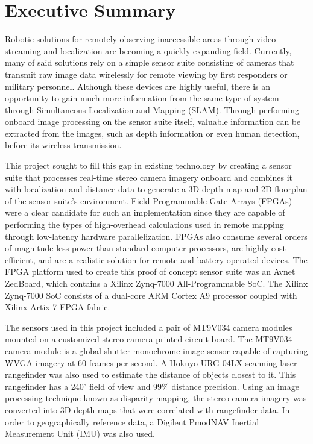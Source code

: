 {}
\section*{Executive Summary}

Robotic solutions for remotely observing inaccessible areas through video streaming and localization are becoming a quickly expanding field. Currently, many of said solutions rely on a simple sensor suite consisting of cameras that transmit raw image data wirelessly for remote viewing by first responders or military personnel. Although these devices are highly useful, there is an opportunity to gain much more information from the same type of system through Simultaneous Localization and Mapping (SLAM). Through performing onboard image processing on the sensor suite itself, valuable information can be extracted from the images, such as depth information or even human detection, before its wireless transmission.
\par
This project sought to fill this gap in existing technology by creating a sensor suite that processes real-time stereo camera imagery onboard and combines it with localization and distance data to generate a 3D depth map and 2D floorplan of the sensor suite's environment. Field Programmable Gate Arrays (FPGAs) were a clear candidate for such an implementation since they are capable of performing the types of high-overhead calculations used in remote mapping through low-latency hardware parallelization. FPGAs also consume several orders of magnitude less power than standard computer processors, are highly cost efficient, and are a realistic solution for remote and battery operated devices. The FPGA platform used to create this proof of concept sensor suite was an Avnet ZedBoard, which contains a Xilinx Zynq-7000 All-Programmable SoC. The Xilinx Zynq-7000 SoC consists of a dual-core ARM Cortex A9 processor coupled with Xilinx Artix-7 FPGA fabric.
\par
The sensors used in this project included a pair of MT9V034 camera modules mounted on a customized stereo camera printed circuit board. The MT9V034 camera module is a global-shutter monochrome image sensor capable of capturing WVGA imagery at 60 frames per second. A Hokuyo URG-04LX scanning laser rangefinder was also used to estimate the distance of objects closest to it. This rangefinder has a 240$^\circ$ field of view and 99\% distance precision. Using an image processing technique known as disparity mapping, the stereo camera imagery was converted into 3D depth maps that were correlated with rangefinder data. In order to geographically reference data, a Digilent PmodNAV Inertial Measurement Unit (IMU) was also used. 
